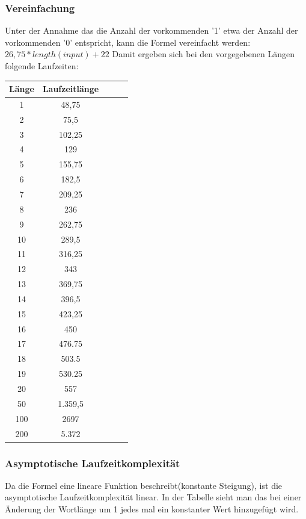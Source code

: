 \subsubsection*{Vereinfachung}
Unter der Annahme das die Anzahl der vorkommenden '1' etwa der Anzahl der vorkommenden '0' entspricht, kann die Formel vereinfacht werden: $26,75 * length(input) + 22 $ 
\newline
\newline
Damit ergeben sich bei den vorgegebenen Längen folgende Laufzeiten:

\begin{center}
\begin{tabular}{|c|c|c|c|c|}
\hline
Länge    & Laufzeitlänge \\ \hline 
1     & 48,75 	\\ \hline 
2     & 75,5 	\\ \hline 
3     & 102,25 	\\ \hline 
4     & 129 	\\ \hline 
5     & 155,75 	\\ \hline 
6     & 182,5 	\\ \hline 
7     & 209,25 	\\ \hline 
8     & 236 	    \\ \hline 
9     & 262,75 	\\ \hline 
10    & 289,5 	\\ \hline 
11    & 316,25 	\\ \hline 
12    & 343 	\\ \hline 
13    & 369,75 	\\ \hline 
14    & 396,5 	\\ \hline 
15    & 423,25 	\\ \hline 
16    & 450 	\\ \hline 
17    & 476.75 	\\ \hline 
18    & 503.5 	\\ \hline 
19    & 530.25 	\\ \hline 
20    & 557	    \\ \hline 
50    & 1.359,5	\\ \hline 
100   & 2697	    \\ \hline 
200	  & 5.372	\\ \hline 

\end{tabular}
\end{center}

\subsubsection*{Asymptotische Laufzeitkomplexität}
Da die Formel eine lineare Funktion beschreibt(konstante Steigung), ist die asymptotische Laufzeitkomplexität linear. In der Tabelle sieht man das bei einer Änderung der Wortlänge um 1 jedes mal ein konstanter Wert hinzugefügt wird.

